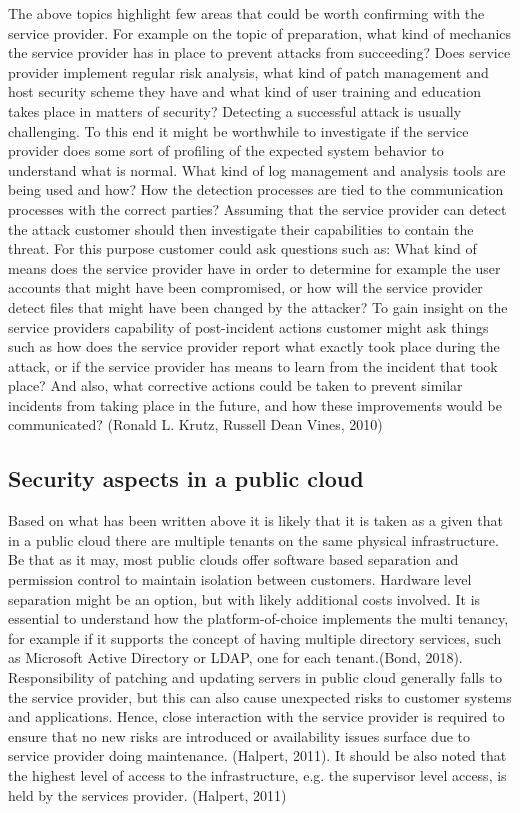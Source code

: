 \documentclass{article}
\begin{document}
The above topics highlight few areas that could be worth confirming with the service provider. For example on the topic of preparation, what kind of mechanics the service provider has in place to prevent attacks from succeeding? Does service provider implement regular risk analysis, what kind of patch management and host security scheme they have and what kind of user training and education takes place in matters of security? Detecting a successful attack is usually challenging. To this end it might be worthwhile to investigate if the service provider does some sort of profiling of the expected system behavior to understand what is normal. What kind of log management and analysis tools are being used and how? How the detection processes are tied to the communication processes with the correct parties? Assuming that the service provider can detect the attack customer should then investigate their capabilities to contain the threat. For this purpose customer could ask questions such as: What kind of means does the service provider have in order to determine for example the user accounts that might have been compromised, or how will the service provider detect files that might have been changed by the attacker? To gain insight on the service providers capability of post-incident actions customer might ask things such as how does the service provider report what exactly took place during the attack, or if the service provider has means to learn from the incident that took place? And also, what corrective actions could be taken to prevent similar incidents from taking place in the future, and how these improvements would be communicated? (Ronald L. Krutz, Russell Dean Vines, 2010)
\subsection{Security aspects in a public cloud}
Based on what has been written above it is likely that it is taken as a given that in a public cloud there are multiple tenants on the same physical infrastructure.
Be that as it may, most public clouds offer software based separation and permission control to maintain isolation between customers. Hardware level separation might be an option, but with likely additional costs involved. It is essential to understand how the platform-of-choice implements the multi tenancy, for example if it supports the concept of having multiple directory services, such as Microsoft Active Directory or LDAP, one for each tenant.(Bond, 2018).
Responsibility of patching and updating servers in public cloud generally falls to the service provider, but this can also cause unexpected risks to customer systems and applications. Hence, close interaction with the service provider is required to ensure that no new risks are introduced  or availability issues surface due to service provider doing maintenance. (Halpert, 2011).
It should be also noted that the highest level of access to the infrastructure, e.g. the supervisor level access, is held by the services provider. (Halpert, 2011)
\end{document}
